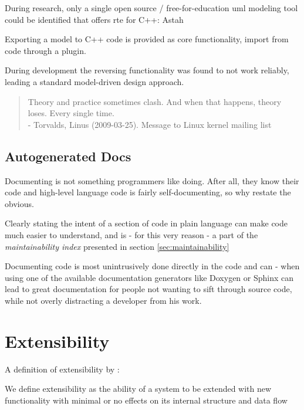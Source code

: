 During research, only a single open source / free-for-education \gls{uml} modeling tool could be identified that offers \gls{rte} for C++: Astah

Exporting a model to C++ code is provided as core functionality, import from code through a plugin.

During development the reversing functionality was found to not work reliably, leading a standard model-driven design approach.

\begin{quote}
Theory and practice sometimes clash. And when that happens, theory loses. Every single time.\\
- Torvalds, Linus (2009-03-25). Message to Linux kernel mailing list
\end{quote}

\subsection{Autogenerated Docs}
Documenting is not something programmers like doing. After all, they know their code and high-level language code is fairly self-documenting, so why restate the obvious.


Clearly stating the intent of a section of code in plain language can make code much easier to understand, and is - for this very reason - a part of the \textit{maintainability index} presented in section \ref{sec:maintainability}

Documenting code is most unintrusively done directly in the code and can - when using one of the available documentation generators like Doxygen or Sphinx can lead to great documentation for people not wanting to sift through source code, while not overly distracting a developer from his work.

\section{Extensibility}

A definition of extensibility by \citet{Johansson}:
\begin{definition}
We define extensibility as the ability of a system to be extended with new functionality with minimal or no effects on its internal structure and data flow
\end{definition}

